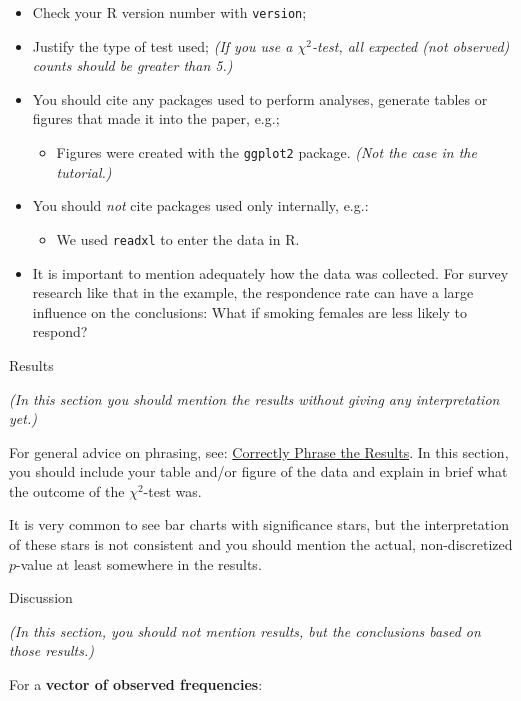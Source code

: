 \documentclass[
]{book}
\providecommand{\tightlist}{%
  \setlength{\itemsep}{0pt}\setlength{\parskip}{0pt}}
\begin{document}
\begin{itemize}
\tightlist
\item
  Check your R version number with \texttt{version};
\item
  Justify the type of test used; \emph{(If you use a \(\chi^2\)-test, all expected (not observed) counts should be greater than 5.)}
\item
  You should cite any packages used to perform analyses, generate tables or figures that made it into the paper, e.g.;

  \begin{itemize}
  \tightlist
  \item
    Figures were created with the \texttt{ggplot2} package.\citep{ggplot2} \emph{(Not the case in the tutorial.)}
  \end{itemize}
\item
  You should \emph{not} cite packages used only internally, e.g.:

  \begin{itemize}
  \tightlist
  \item
    We used \texttt{readxl} to enter the data in R.\citep{readxl}
  \end{itemize}
\item
  It is important to mention adequately how the data was collected. For survey research like that in the example, the respondence rate can have a large influence on the conclusions: What if smoking females are less likely to respond?
\end{itemize}

Results

\emph{(In this section you should mention the results without giving any interpretation yet.)}

For general advice on phrasing, see: \protect\hyperlink{results-chi}{Correctly Phrase the Results}. In this section, you should include your table and/or figure of the data and explain in brief what the outcome of the \(\chi^2\)-test was.

It is very common to see bar charts with significance stars, but the interpretation of these stars is not consistent and you should mention the actual, non-discretized \(p\)-value at least somewhere in the results.

Discussion

\emph{(In this section, you should not mention results, but the conclusions based on those results.)}

For a \textbf{vector of observed frequencies}:
\end{document}
